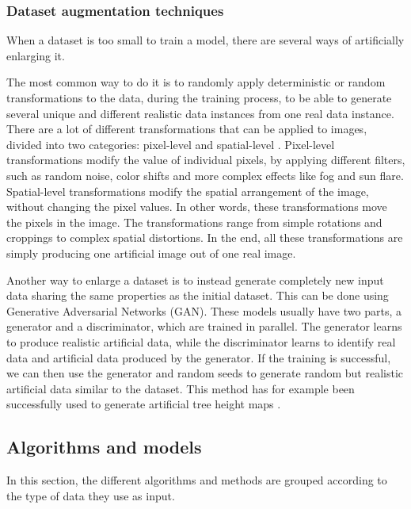\documentclass[
  letterpaper,
  DIV=11,
  numbers=noendperiod]{scrartcl}
\begin{document}
\subsubsection{Dataset augmentation
techniques}\label{sec-sota-dataset-augment}

When a dataset is too small to train a model, there are several ways of
artificially enlarging it.

The most common way to do it is to randomly apply deterministic or
random transformations to the data, during the training process, to be
able to generate several unique and different realistic data instances
from one real data instance. There are a lot of different
transformations that can be applied to images, divided into two
categories: pixel-level and spatial-level \autocite{albumentations}.
Pixel-level transformations modify the value of individual pixels, by
applying different filters, such as random noise, color shifts and more
complex effects like fog and sun flare. Spatial-level transformations
modify the spatial arrangement of the image, without changing the pixel
values. In other words, these transformations move the pixels in the
image. The transformations range from simple rotations and croppings to
complex spatial distortions. In the end, all these transformations are
simply producing one artificial image out of one real image.

Another way to enlarge a dataset is to instead generate completely new
input data sharing the same properties as the initial dataset. This can
be done using Generative Adversarial Networks (GAN). These models
usually have two parts, a generator and a discriminator, which are
trained in parallel. The generator learns to produce realistic
artificial data, while the discriminator learns to identify real data
and artificial data produced by the generator. If the training is
successful, we can then use the generator and random seeds to generate
random but realistic artificial data similar to the dataset. This method
has for example been successfully used to generate artificial tree
height maps \autocite{gan_data_augment}.

\subsection{Algorithms and models}\label{algorithms-and-models}

In this section, the different algorithms and methods are grouped
according to the type of data they use as input.
\end{document}
